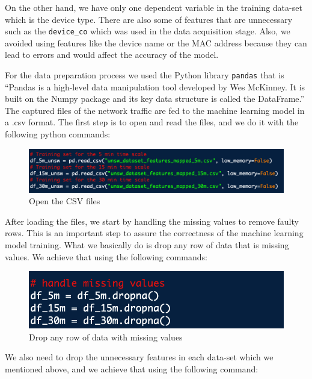 \documentclass{article}
\begin{document}
On the other hand, we have only one dependent variable in the training data-set which is the device type. There are also some of features that are unnecessary such as the \texttt{device\_co} which was used in the data acquisition stage. Also, we avoided using features like the device name or the MAC address because they can lead to errors and would affect the accuracy of the model.\pagebreak

For the data preparation process we used the Python library \texttt{pandas} that is “Pandas is a high-level data manipulation tool developed by Wes McKinney. It is built on the Numpy package and its key data structure is called the DataFrame.” \cite{PandasBasics} The captured files of the network traffic are fed to the machine learning model in a .csv format. The first step is to open and read the files, and we do it with the following python commands:\newline

\begin{figure}[!ht]
    \centering
    \includegraphics[width=15cm]{MLgraphs/opencsv.png}
    \caption{Open the CSV files} 
\end{figure}


After loading the files, we start by handling the missing values to remove faulty rows. This is an important step to assure the correctness of the machine learning model training. What we basically do is drop any row of data that is missing values. We achieve that using the following commands: \newline

\begin{figure}[!ht]
    \centering
    \includegraphics[width=13cm]{MLgraphs/droprowmissingvalue.png}
    \caption{Drop any row of data with missing values} 
\end{figure}
\pagebreak

We also need to drop the unnecessary features in each data-set which we mentioned above, and we achieve that using the following command:\newline
\end{document}
